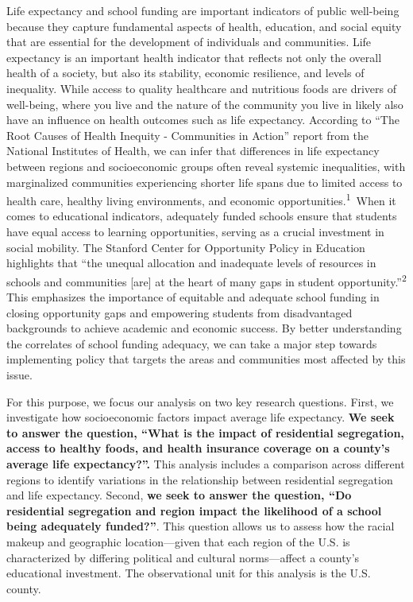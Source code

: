 \documentclass[
  10pt,
  letterpaper,
  DIV=11,
  numbers=noendperiod]{scrartcl}
\begin{document}
Life expectancy and school funding are important indicators of public
well-being because they capture fundamental aspects of health,
education, and social equity that are essential for the development of
individuals and communities. Life expectancy is an important health
indicator that reflects not only the overall health of a society, but
also its stability, economic resilience, and levels of inequality. While
access to quality healthcare and nutritious foods are drivers of
well-being, where you live and the nature of the community you live in
likely also have an influence on health outcomes such as life
expectancy. According to ``The Root Causes of Health Inequity -
Communities in Action'' report from the National Institutes of Health,
we can infer that differences in life expectancy between regions and
socioeconomic groups often reveal systemic inequalities, with
marginalized communities experiencing shorter life spans due to limited
access to health care, healthy living environments, and economic
opportunities.\textsuperscript{1}~When it comes to educational
indicators, adequately funded schools ensure that students have equal
access to learning opportunities, serving as a crucial investment in
social mobility. The Stanford Center for Opportunity Policy in Education
highlights that ``the unequal allocation and inadequate levels of
resources in schools and communities {[}are{]} at the heart of many gaps
in student opportunity.''\textsuperscript{2} This emphasizes the
importance of equitable and adequate school funding in closing
opportunity gaps and empowering students from disadvantaged backgrounds
to achieve academic and economic success. By better understanding the
correlates of school funding adequacy, we can take a major step towards
implementing policy that targets the areas and communities most affected
by this issue.

For this purpose, we focus our analysis on two key research questions.
First, we investigate how socioeconomic factors impact average life
expectancy. \textbf{We seek to answer the question, ``What is the impact
of residential segregation, access to healthy foods, and health
insurance coverage on a county's average life expectancy?''.} This
analysis includes a comparison across different regions to identify
variations in the relationship between residential segregation and life
expectancy. Second, \textbf{we seek to answer the question, ``Do
residential segregation and region impact the likelihood of a school
being adequately funded?''}. This question allows us to assess how the
racial makeup and geographic location---given that each region of the
U.S. is characterized by differing political and cultural norms---affect
a county's educational investment. The observational unit for this
analysis is the U.S. county.
\end{document}
